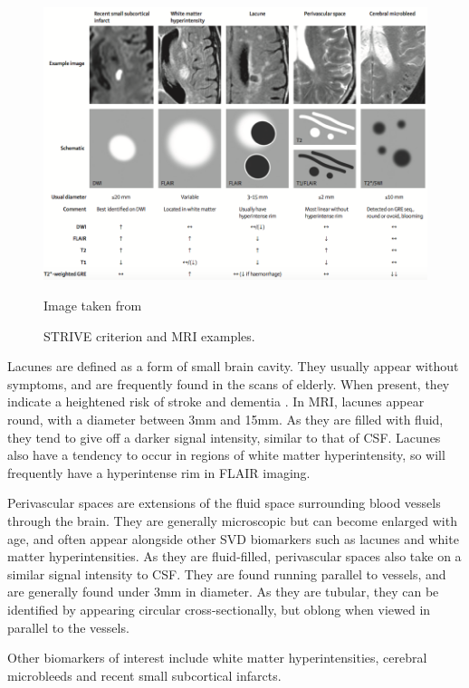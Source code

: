 \documentclass[honours,12pt]{unswthesis}
\numberwithin{equation}{section}
\begin{document}
\begin{figure}[ht]
	\centering
	\includegraphics[width = \textwidth]{Images/2_STRIVE.png}
	\caption{STRIVE criterion and MRI examples.}
	\small Image taken from \cite{WardlawJ.M.2013Nsfr}
\end{figure}

Lacunes are defined as a form of small brain cavity. They usually appear without symptoms, and are frequently found in the scans of elderly. When present, they indicate a heightened risk of stroke and dementia \cite{VanDerFlierM.Wiesje2005SVDa, BenjaminJ.Philip2018LIbN}. In MRI, lacunes appear round, with a diameter between 3mm and 15mm. As they are filled with fluid, they tend to give off a darker signal intensity, similar to that of CSF. Lacunes also have a tendency to occur in regions of white matter hyperintensity, so will frequently have a hyperintense rim in FLAIR imaging.

Perivascular spaces are extensions of the fluid space surrounding blood vessels through the brain. They are generally microscopic but can become enlarged with age, and often appear alongside other SVD biomarkers such as lacunes and white matter hyperintensities. As they are fluid-filled, perivascular spaces also take on a similar signal intensity to CSF. They are found running parallel to vessels, and are generally found under 3mm in diameter. As they are tubular, they can be identified by appearing circular cross-sectionally, but oblong when viewed in parallel to the vessels.

Other biomarkers of interest include white matter hyperintensities, cerebral microbleeds and recent small subcortical infarcts. 
\end{document}
